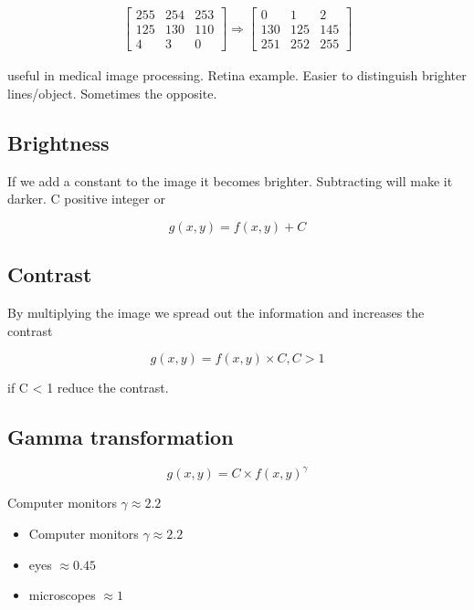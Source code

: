 \documentclass[a4paper]{article}
\begin{document}
\begin{equation}
\begin{aligned}
\begin{bmatrix} 255& 254& 253 \\ 
                125& 130& 110 \\ 
                4& 3& 0 \end{bmatrix} 
                \Rightarrow 
\begin{bmatrix} 0& 1& 2 \\ 
        130& 125& 145 \\ 
        251& 252& 255
        \end{bmatrix}
\end{aligned}
\end{equation}

useful in medical image processing. Retina example. Easier to distinguish brighter lines/object. Sometimes the opposite.

\subsection{Brightness}
If we add a constant to the image it becomes brighter. Subtracting will make it darker. C positive integer or

\begin{equation}
g(x,y) = f(x,y) + C
\end{equation}


\subsection{Contrast}
By multiplying the image we spread out the information and increases the contrast

\begin{equation}
g(x,y) = f(x,y) \times C, C > 1
\end{equation}

if C < 1 reduce the contrast. 


\subsection{Gamma transformation}

\begin{equation}
g(x,y) = C \times f(x,y)^{\gamma}
\end{equation}

Computer monitors $ \gamma \approx 2.2$

\begin{itemize}
    \item Computer monitors $ \gamma \approx 2.2$
    \item eyes $\approx 0.45$
    \item microscopes $\approx 1$
\end{itemize}
\end{document}
